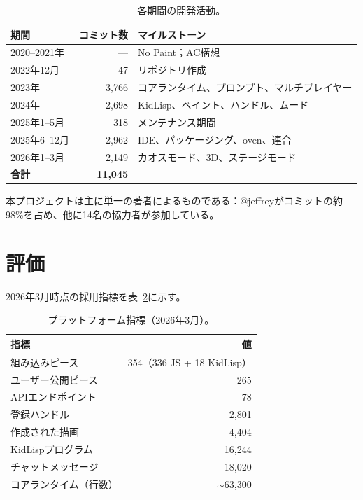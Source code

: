 \documentclass[10pt,letterpaper,twocolumn]{article}
\begin{document}
\begin{table}[h]
\small
\centering
\begin{tabular}{lrl}
\toprule
\textbf{期間} & \textbf{コミット数} & \textbf{マイルストーン} \\
\midrule
2020--2021年 & --- & No Paint；AC構想 \\
2022年12月 & 47 & リポジトリ作成 \\
2023年 & 3{,}766 & コアランタイム、プロンプト、マルチプレイヤー \\
2024年 & 2{,}698 & KidLisp、ペイント、ハンドル、ムード \\
2025年1--5月 & 318 & メンテナンス期間 \\
2025年6--12月 & 2{,}962 & IDE、パッケージング、oven、連合 \\
2026年1--3月 & 2{,}149 & カオスモード、3D、ステージモード \\
\midrule
\textbf{合計} & \textbf{11{,}045} & \\
\bottomrule
\end{tabular}
\caption{各期間の開発活動。}
\label{tab:history}
\end{table}

本プロジェクトは主に単一の著者によるものである：@jeffreyがコミットの約98\%を占め、他に14名の協力者が参加している。


\section{評価}
\label{sec:evaluation}

2026年3月時点の採用指標を表~\ref{tab:adoption}に示す。

\begin{table}[h]
\small
\centering
\begin{tabular}{lr}
\toprule
\textbf{指標} & \textbf{値} \\
\midrule
組み込みピース & 354（336 JS + 18 KidLisp） \\
ユーザー公開ピース & 265 \\
APIエンドポイント & 78 \\
登録ハンドル & 2,801 \\
作成された描画 & 4,404 \\
KidLispプログラム & 16,244 \\
チャットメッセージ & 18,020 \\
コアランタイム（行数） & $\sim$63,300 \\
\bottomrule
\end{tabular}
\caption{プラットフォーム指標（2026年3月）。}
\label{tab:adoption}
\end{table}
\end{document}

